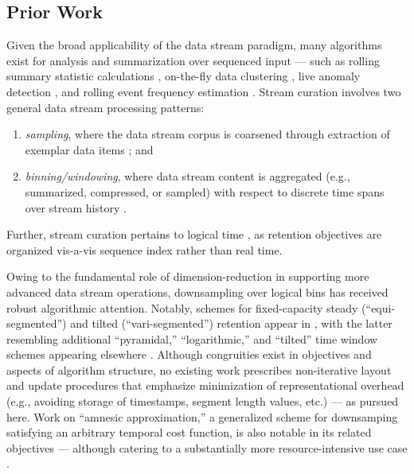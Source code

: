 \subsection{Prior Work}
\label{sec:prior-work}

Given the broad applicability of the data stream paradigm, many algorithms exist for analysis and summarization over sequenced input --- such as rolling summary statistic calculations \citep{lin2004continuously}, on-the-fly data clustering \citep{silva2013data}, live anomaly detection \citep{cai2004maids}, and rolling event frequency estimation \citep{manku2002approximate}.
Stream curation involves two general data stream processing patterns:
\begin{enumerate}
\item \textit{sampling}, where the data stream corpus is coarsened through extraction of exemplar data items \citep{sibai2016sampling}; and
\item \textit{binning/windowing}, where data stream content is aggregated (e.g., summarized, compressed, or sampled) with respect to discrete time spans over stream history \citep{gama2007data}.
\end{enumerate}
Further, stream curation pertains to logical time \citep{sibai2016sampling}, as retention objectives are organized vis-a-vis sequence index rather than real time.

Owing to the fundamental role of dimension-reduction in supporting more advanced data stream operations, downsampling over logical bins has received robust algorithmic attention.
Notably, schemes for fixed-capacity steady (``equi-segmented'') and tilted (``vari-segmented'') retention appear in \citep{zhao2005generalized}, with the latter resembling additional ``pyramidal,'' ``logarithmic,'' and ``tilted'' time window schemes appearing elsewhere \citep{aggarwal2003framework,han2005stream,giannella2003mining,phithakkitnukoon2010recent}.
Although congruities exist in objectives and aspects of algorithm structure, no existing work prescribes non-iterative layout and update procedures that emphasize minimization of representational overhead (e.g., avoiding storage of timestamps, segment length values, etc.) --- as pursued here.
Work on ``amnesic approximation,'' a generalized scheme for downsamping satisfying an arbitrary temporal cost function, is also notable in its related objectives --- although catering to a substantially more resource-intensive use case \citep{palpanas2004online}.


